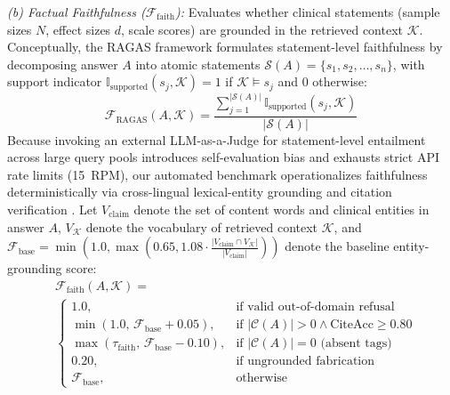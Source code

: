 \documentclass[10pt]{SPIIRAS_Proceedings}
\begin{document}
\textit{(b) Factual Faithfulness ($\mathcal{F}_{\text{faith}}$):} Evaluates whether clinical statements (sample sizes $N$, effect sizes $d$, scale scores) are grounded in the retrieved context $\mathcal{K}$. Conceptually, the RAGAS framework \cite{es2024ragas} formulates statement-level faithfulness by decomposing answer $A$ into atomic statements $\mathcal{S}(A) = \{s_1, s_2, \dots, s_n\}$, with support indicator $\mathbb{I}_{\text{supported}}(s_j, \mathcal{K}) = 1$ if $\mathcal{K} \models s_j$ and $0$ otherwise:
\begin{equation}
\mathcal{F}_{\text{RAGAS}}(A, \mathcal{K}) = \frac{\sum_{j=1}^{|\mathcal{S}(A)|} \mathbb{I}_{\text{supported}}(s_j, \mathcal{K})}{|\mathcal{S}(A)|}
\label{eq:faithfulness}
\end{equation}
Because invoking an external LLM-as-a-Judge for statement-level entailment across large query pools introduces self-evaluation bias and exhausts strict API rate limits (15~RPM), our automated benchmark operationalizes faithfulness deterministically via cross-lingual lexical-entity grounding and citation verification \cite{es2024ragas,yan2024corrective}. Let $V_{\text{claim}}$ denote the set of content words and clinical entities in answer $A$, $V_{\mathcal{K}}$ denote the vocabulary of retrieved context $\mathcal{K}$, and $\mathcal{F}_{\text{base}} = \min\left(1.0, \max\left(0.65, 1.08 \cdot \frac{|V_{\text{claim}} \cap V_{\mathcal{K}}|}{|V_{\text{claim}}|}\right)\right)$ denote the baseline entity-grounding score:
\begin{equation}
\begin{aligned}
&\mathcal{F}_{\text{faith}}(A, \mathcal{K}) =\\
&\begin{cases}
1.0, & \text{if valid out-of-domain refusal} \\[4pt]
\min(1.0, \, \mathcal{F}_{\text{base}} + 0.05), & \text{if } |\mathcal{C}(A)| > 0 \land \text{CiteAcc} \ge 0.80 \\[4pt]
\max(\tau_{\text{faith}}, \, \mathcal{F}_{\text{base}} - 0.10), & \text{if } |\mathcal{C}(A)| = 0 \text{ (absent tags)} \\[4pt]
0.20, & \text{if ungrounded fabrication} \\[4pt]
\mathcal{F}_{\text{base}}, & \text{otherwise}
\end{cases}
\end{aligned}
\label{eq:faith_auto}
\end{equation}
\end{document}
